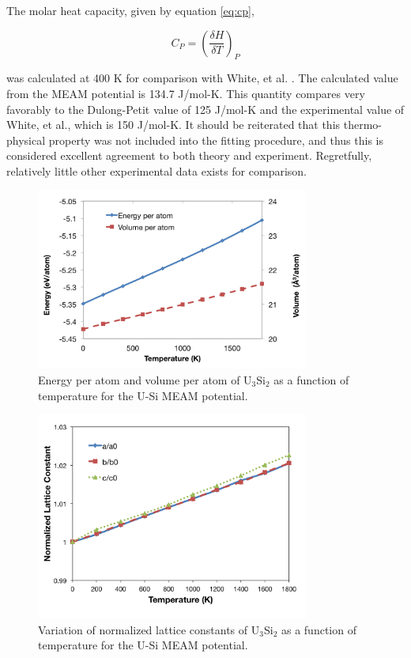 \documentclass[review]{elsarticle}
\begin{document}
The molar heat capacity, given by equation \ref{eq:cp}, 

\begin{equation}
\label{eq:cp}
C_{P} = \left(\frac{\delta H}{\delta T}\right)_{P}
\end{equation}

was calculated at 400 K for comparison with White, et al. \cite{white2015}.  The calculated value from the MEAM potential is 134.7 J/mol-K.  This quantity compares very favorably to the Dulong-Petit value of 125 J/mol-K and the experimental value of White, et al., which is 150 J/mol-K.  It should be reiterated that this thermo-physical property was not included into the fitting procedure, and thus this is considered excellent agreement to both theory and experiment.  Regretfully, relatively little other experimental data exists for comparison.  

 \begin{figure}[hbt]
	\centering
	\includegraphics[width=0.8\textwidth]{tempKK1.png}
    \caption{Energy per atom and volume per atom of U$_{3}$Si$_{2}$ as a function of temperature for the U-Si MEAM potential.}\label{fig:temp}
\end{figure}

\begin{figure}[hbt]
	\centering
	\includegraphics[width=0.8\textwidth]{latticeKK1.png}
    \caption{Variation of normalized lattice constants of U$_{3}$Si$_{2}$ as a function of temperature for the U-Si MEAM potential.}\label{fig:latticetemp}
\end{figure}
\end{document}
